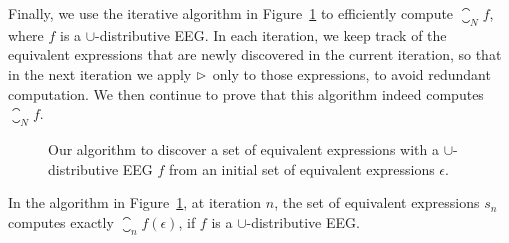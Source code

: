 Finally, we use the iterative algorithm in Figure~\ref{so:alg:closure} to
efficiently compute $\closure_N f$, where $f$ is a $\cup$-distributive EEG\@.
In each iteration, we keep track of the equivalent expressions that are newly
discovered in the current iteration, so that in the next iteration we apply
$\mathbin{\rhd}$ only to those expressions, to avoid redundant computation.  We then
continue to prove that this algorithm indeed computes $\closure_N f$.
\begin{figure}[ht]
    \centering
    \begin{algorithmic}
                \EndIf{}
            \EndFor{}
        \EndFunction{}
    \end{algorithmic}
    \caption{%
        Our algorithm to discover a set of equivalent expressions with
        a $\cup$-distributive EEG $f$ from an initial set of equivalent
        expressions $\epsilon$.
    }\label{so:alg:closure}
\end{figure}
\begin{theorem}
    In the algorithm in Figure~\ref{so:alg:closure}, at iteration $n$, the set
    of equivalent expressions $s_n$ computes exactly $\closure_n f(\epsilon)$,
    if $f$ is a $\cup$-distributive EEG\@.
\end{theorem}
